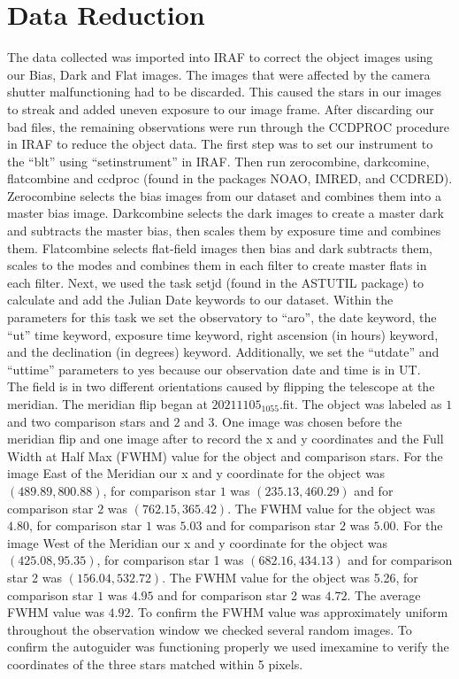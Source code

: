\section{Data Reduction}
\label{sec:data}

The data collected was imported into IRAF to correct the object images using our Bias, 
Dark and Flat images. The images that were affected by the camera shutter malfunctioning 
had to be discarded. This caused the stars in our images to streak and added uneven exposure 
to our image frame. After discarding our bad files, the remaining observations were run 
through the CCDPROC procedure in IRAF to reduce the object data. The first step was to 
set our instrument to the “blt” using “setinstrument” in IRAF. Then run zerocombine, 
darkcomine, flatcombine and ccdproc (found in the packages NOAO, IMRED, and CCDRED). 
Zerocombine selects the bias images from our dataset and combines them into a master 
bias image. Darkcombine selects the dark images to create a master dark and subtracts 
the master bias, then scales them by exposure time and combines them. Flatcombine selects 
flat-field images then bias and dark subtracts them, scales to the modes and combines 
them in each filter to create master flats in each filter. Next, we used the task setjd 
(found in the ASTUTIL package) to calculate and add the Julian Date keywords to our dataset. 
Within the parameters for this task we set the observatory to “aro”, the date keyword, the 
“ut” time keyword, exposure time keyword, right ascension (in hours) keyword, and the declination 
(in degrees) keyword. Additionally, we set the “utdate” and “uttime” parameters to yes 
because our observation date and time is in UT. \\

The field is in two different orientations caused by flipping the telescope at the meridian. 
The meridian flip began at $20211105_ 1055$.fit. The object was labeled as $1$ and two comparison 
stars and $2$ and $3$. One image was chosen before the meridian flip and one image after to record
the x and y coordinates and the Full Width at Half Max (FWHM) value for the object and 
comparison stars. For the image East of the Meridian our x and y coordinate for the 
object was $(489.89, 800.88)$, for comparison star $1$ was $(235.13, 460.29)$ and for comparison 
star $2$ was $(762.15, 365.42)$. The FWHM value for the object was $4.80$, for comparison star 
$1$ was $5.03$ and for comparison star $2$ was $5.00$. For the image West of the Meridian our x and 
y coordinate for the object was $(425.08, 95.35)$, for comparison star 1 was $(682.16, 434.13)$ 
and for comparison star 2 was $(156.04, 532.72)$. The FWHM value for the object was 5.26, for 
comparison star $1$ was $4.95$ and for comparison star 2 was $4.72$. The average FWHM value was $4.92$. 
To confirm the FWHM value was approximately uniform throughout the observation window we 
checked several random images. To confirm the autoguider was functioning properly we used 
imexamine to verify the coordinates of the three stars matched within 5 pixels. \\

